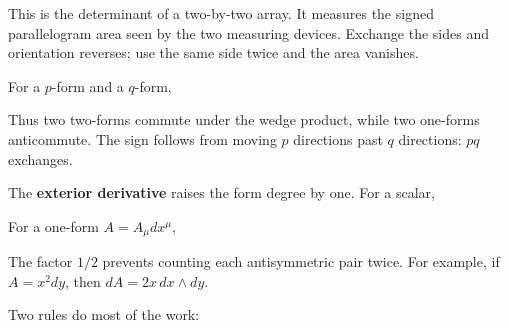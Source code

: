 \documentclass[
  11pt,
  letterpaper,
  oneside,
  openany]{scrbook}
\begin{document}
This is the determinant of a two-by-two array. It measures the signed
parallelogram area seen by the two measuring devices. Exchange the sides
and orientation reverses; use the same side twice and the area vanishes.

For a \(p\)-form and a \(q\)-form,

\begin{center}
\begingroup
{}
\ifdim\wd\grmathbox>\linewidth
\resizebox{\linewidth}{!}{\usebox{\grmathbox}}
\else\usebox{\grmathbox}\fi
\endgroup
\end{center}

Thus two two-forms commute under the wedge product, while two one-forms
anticommute. The sign follows from moving \(p\) directions past \(q\)
directions: \(pq\) exchanges.

The \textbf{exterior derivative} raises the form degree by one. For a
scalar,

\begin{center}
\begingroup
{}
\ifdim\wd\grmathbox>\linewidth
\resizebox{\linewidth}{!}{\usebox{\grmathbox}}
\else\usebox{\grmathbox}\fi
\endgroup
\end{center}

For a one-form \(A=A_\mu dx^\mu\),

\begin{center}
\begingroup
{}
\ifdim\wd\grmathbox>\linewidth
\resizebox{\linewidth}{!}{\usebox{\grmathbox}}
\else\usebox{\grmathbox}\fi
\endgroup
\end{center}

The factor \(1/2\) prevents counting each antisymmetric pair twice. For
example, if \(A=x^2dy\), then \(dA=2x\,dx\wedge dy\).

Two rules do most of the work:

\begin{center}
\begingroup
{}
\ifdim\wd\grmathbox>\linewidth
\resizebox{\linewidth}{!}{\usebox{\grmathbox}}
\else\usebox{\grmathbox}\fi
\endgroup
\end{center}
\end{document}
